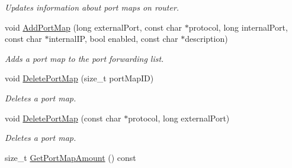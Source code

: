\begin{DoxyCompactItemize}
\begin{DoxyCompactList}\small\item\em Updates information about port maps on router. \item\end{DoxyCompactList}\item 
void \hyperlink{class_upnp_nat_action_a937cd75c9da1886790ae93313464eab4}{AddPortMap} (long externalPort, const char $\ast$protocol, long internalPort, const char $\ast$internalIP, bool enabled, const char $\ast$description)
\begin{DoxyCompactList}\small\item\em Adds a port map to the port forwarding list. \item\end{DoxyCompactList}\item 
void \hyperlink{class_upnp_nat_action_a9f2ad1ad9b1871f91628d09dea22d8bb}{DeletePortMap} (size\_\-t portMapID)
\begin{DoxyCompactList}\small\item\em Deletes a port map. \item\end{DoxyCompactList}\item 
void \hyperlink{class_upnp_nat_action_a8f3d3e0e3a73d4a8dee0116dff20ac3b}{DeletePortMap} (const char $\ast$protocol, long externalPort)
\begin{DoxyCompactList}\small\item\em Deletes a port map. \item\end{DoxyCompactList}\item 
\hypertarget{class_upnp_nat_action_a73a81195371ab22bcf55a86582ba9718}{
size\_\-t \hyperlink{class_upnp_nat_action_a73a81195371ab22bcf55a86582ba9718}{GetPortMapAmount} () const }
\label{class_upnp_nat_action_a73a81195371ab22bcf55a86582ba9718}


\end{DoxyCompactItemize}
